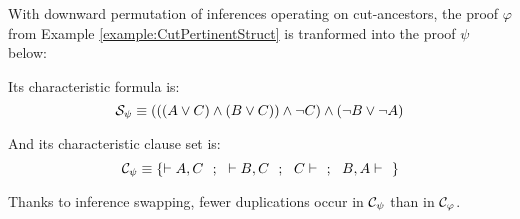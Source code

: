 \begin{example}
\label{example:InferencePermutation}
With downward permutation of inferences operating on cut-ancestors, the proof $\varphi$ from Example \ref{example:CutPertinentStruct} is tranformed into the proof $\psi$ below:
\begin{tiny}
\begin{prooftree}
 
 
		   		
				 
				 
						   		
			  		
						 
							 
						 
						  
\end{prooftree}
\end{tiny}

\noindent
Its characteristic formula is:
$$
\struct{\psi} 
\equiv 
(((A\structtimes C) \structplus (B\structtimes C)) \structplus \structdual{C}) \structplus (\structdual{B} \structtimes \structdual{A})
$$

\noindent
And its characteristic clause set is: 
$$
\clauseset{\psi} \equiv \{ \seq A,C \ \ ; \ \ \seq B,C \ \ ; \ \ C \seq \ \ ; \ \ B, A \seq \ \  \}
$$

\noindent 
Thanks to inference swapping, fewer duplications occur in $\clauseset{\psi}$ than in $\clauseset{\varphi}$.
\hfill\QED
\end{example}


